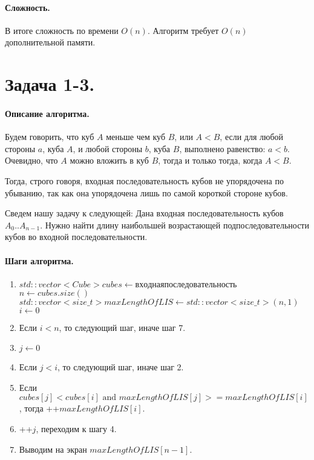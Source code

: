 \documentclass[12pt]{article}
\begin{document}
\paragraph{Сложность.}
В итоге сложность по времени $O(n)$. Алгоритм требует $O(n)$ дополнительной памяти.




\section{Задача 1-3.} 
\paragraph{Описание алгоритма.}
Будем говорить, что куб $ A $ меньше чем куб $ B $, или $ A < B $, если для любой стороны $ a $, куба $ A $,
и любой стороны $ b $, куба $ B $, выполнено равенство: $ a < b $.
Очевидно, что $ A $ можно вложить в куб $ B $, тогда и только тогда, когда $ A < B $.

Тогда, строго говоря, входная последовательность кубов не упорядочена по убыванию, так как она упорядочена лишь
по самой короткой стороне кубов. 

Сведем нашу задачу к следующей: Дана входная последовательность кубов $A_0..A_{n-1}$.
Нужно найти длину наибольшей возрастающей подпоследовательности кубов во входной последовательности.

\paragraph{Шаги алгоритма.}
\begin{enumerate}
    \item $ std::vector<Cube> cubes \leftarrow входная последовательность $ \\
          $ n \leftarrow cubes.size() $ \\
          $ std::vector<size\_t> maxLengthOfLIS \leftarrow std::vector<size\_t>(n, 1)$ \\
          $ i \leftarrow 0 $
    \item Если $ i < n $, то следующий шаг, иначе шаг 7.
    \item $ j \leftarrow 0 $
    \item Если $ j < i $, то следующий шаг, иначе шаг 2.
    \item Если $ cubes[j] < cubes[i] \mbox{   and   } maxLengthOfLIS[j] >= maxLengthOfLIS[i] $, тогда ++$ maxLengthOfLIS[i] $.
    \item ++$j$, переходим к шагу 4.
    \item Выводим на экран $ maxLengthOfLIS[n - 1] $.
\end{enumerate}
\end{document}
